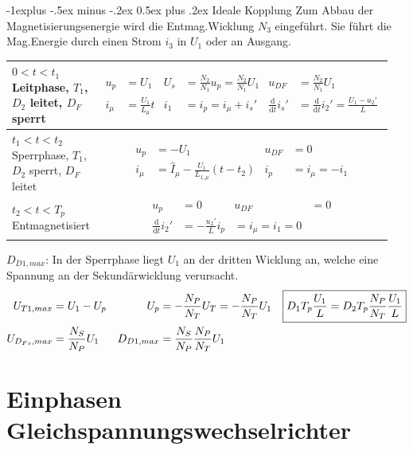 \documentclass[10pt,landscape]{scrartcl}
\makeatletter
\renewcommand{\subsection}{\@startsection{subsection}{2}{0mm}%
                                {-1explus -.5ex minus -.2ex}%
                                {0.5ex plus .2ex}%
                                {\normalfont\normalsize\bfseries}}
\makeatother
\begin{document}
\begin{multicols}{2}
\subsection{Ideale Kopplung}
Zum Abbau der Magnetisierungsenergie wird die Entmag.Wicklung $N_3$ eingeführt. Sie führt die Mag.Energie durch einen Strom $i_3$ in $U_1$ oder an Ausgang.


\begin{tabular}{p{0.30\linewidth}|p{0.65\linewidth}}
  $0<t<t_1$ Leitphase, $T_1$, $D_2$ leitet, $D_F$ sperrt &
  {\begin{align*}
    u_p &= U_1 & 
    U_s &= \frac{N_2}{N_1}u_p = \frac{N_2}{N_1}U_1 & 
    u_{DF} &= \frac{N_2}{N_1}U_1
    \\
    i_\mu &= \frac{U_1}{L_\mu}t &
    i_1 &= i_p = i_\mu + i_s' &
    \frac{\mathrm{d}}{\mathrm{d}t}i_s' &= \frac{\mathrm{d}}{\mathrm{d}t}i_2' = \frac{U_1-u_2'}{L}
  \end{align*}} \\ \hline

  $t_1<t<t_2$ Sperrphase, $T_1$, $D_2$ sperrt, $D_F$ leitet &
  {\begin{align*}
    u_p &= -U_1 & 
    u_{DF} &= 0
    \\
    i_\mu &= \hat{I}_\mu-\frac{U_1}{L_{1,\mu}}(t-t_2) &
    i_p &= i_\mu = -i_1
  \end{align*}} \\\hline

  $t_2<t<T_p$ Entmagnetisiert &
  {\begin{align*}
    u_p &= 0 & 
    u_{DF} &= 0
    \\
    \frac{\mathrm{d}}{\mathrm{d}t}i_2' &= -\frac{u_2'}{L}
    i_p &= i_\mu = i_1 = 0
  \end{align*}}
\end{tabular}
  
  $D_{D1,max}$: In der Sperrphase liegt $U_1$ an der dritten Wicklung an, welche eine Spannung an der Sekundärwicklung verursacht.
  \begin{align*}
    U_{T1,max} &= U_1 - U_p &
    U_p &= -\frac{N_P}{N_T}U_T = -\frac{N_P}{N_T}U_1
    \Aboxed{D_1T_p\frac{U_1}{L} &= D_2T_p \frac{N_P}{N_T}\frac{U_1}{L} }
    \\
    U_{D_{Fs},max} &= \frac{N_S}{N_P}U_1 &
    D_{D1,max} &= \frac{N_S}{N_P}\frac{N_P}{N_T}U_1
  \end{align*}
  
\vfill\null
\columnbreak
\section{Einphasen Gleichspannungswechselrichter}


\end{multicols}
\end{document}
